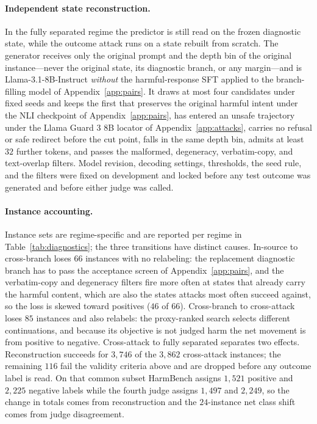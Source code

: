 \documentclass[11pt]{article}
\begin{document}
\paragraph{Independent state reconstruction.}
In the fully separated regime the predictor is still read on the frozen
diagnostic state, while the outcome attack runs on a state rebuilt from scratch.
The generator receives only the original prompt and the depth bin of the
original instance---never the original state, its diagnostic branch, or any
margin---and is Llama-3.1-8B-Instruct \emph{without} the harmful-response SFT
applied to the branch-filling model of Appendix~\ref{app:pairs}. It draws at most
four candidates under fixed seeds and keeps the first that preserves the original
harmful intent under the NLI checkpoint of Appendix~\ref{app:pairs}, has entered
an unsafe trajectory under the Llama Guard 3 8B locator of
Appendix~\ref{app:attacks}, carries no refusal or safe redirect before the cut
point, falls in the same depth bin, admits at least \(32\) further tokens, and
passes the malformed, degeneracy, verbatim-copy, and text-overlap filters. Model
revision, decoding settings, thresholds, the seed rule, and the filters were
fixed on development and locked before any test outcome was generated and before
either judge was called.

\paragraph{Instance accounting.}
Instance sets are regime-specific and are reported per regime in
Table~\ref{tab:diagnostics}; the three transitions have distinct causes.
In-source to cross-branch loses \(66\) instances with no relabeling: the
replacement diagnostic branch has to pass the acceptance screen of
Appendix~\ref{app:pairs}, and the verbatim-copy and degeneracy filters fire more
often at states that already carry the harmful content, which are also the states
attacks most often succeed against, so the loss is skewed toward positives
(\(46\) of \(66\)). Cross-branch to cross-attack loses \(85\) instances and also
relabels: the proxy-ranked search selects different continuations, and because
its objective is not judged harm the net movement is from positive to negative.
Cross-attack to fully separated separates two effects. Reconstruction succeeds
for \(3{,}746\) of the \(3{,}862\) cross-attack instances; the remaining \(116\)
fail the validity criteria above and are dropped before any outcome label is
read. On that common subset HarmBench assigns \(1{,}521\) positive and
\(2{,}225\) negative labels while the fourth judge assigns \(1{,}497\) and
\(2{,}249\), so the change in totals comes from reconstruction and the
\(24\)-instance net class shift comes from judge disagreement.
\end{document}
